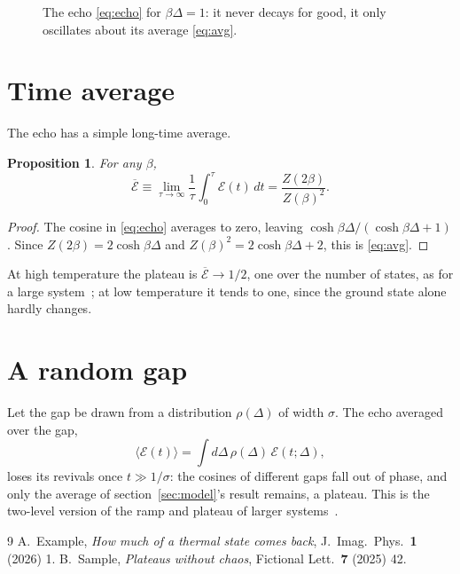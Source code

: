 \documentclass[11pt]{article}
\newtheorem{proposition}{Proposition}
\begin{document}
\begin{figure}[h]
\centering
{}
\caption{The echo \eqref{eq:echo} for $\beta\Delta = 1$: it never decays for good, it only oscillates about its
average \eqref{eq:avg}.}
\label{fig:echo}
\end{figure}

\section{Time average}

The echo has a simple long-time average.

\begin{proposition}
\label{prop:avg}
For any $\beta$,
\begin{equation}
  \overline{\mathcal{E}} \equiv \lim_{\tau\to\infty}\frac{1}{\tau}\int_0^\tau \mathcal{E}(t)\, dt
  = \frac{Z(2\beta)}{Z(\beta)^2}.
  \label{eq:avg}
\end{equation}
\end{proposition}

\begin{proof}
The cosine in \eqref{eq:echo} averages to zero, leaving $\cosh\beta\Delta/(\cosh\beta\Delta+1)$. Since
$Z(2\beta) = 2\cosh\beta\Delta$ and $Z(\beta)^2 = 2\cosh\beta\Delta + 2$, this is \eqref{eq:avg}.
\end{proof}

At high temperature the plateau is $\overline{\mathcal{E}} \to 1/2$, one over the number of states, as for a
large system~\cite{Toy2}; at low temperature it tends to one, since the ground state alone hardly changes.

\section{A random gap}

Let the gap be drawn from a distribution $\rho(\Delta)$ of width $\sigma$. The echo averaged over the gap,
\begin{equation}
  \langle \mathcal{E}(t) \rangle = \int d\Delta\, \rho(\Delta)\, \mathcal{E}(t;\Delta),
  \label{eq:random}
\end{equation}
loses its revivals once $t \gg 1/\sigma$: the cosines of different gaps fall out of phase, and only the average
of section~\ref{sec:model}'s result remains, a plateau. This is the two-level version of the ramp and plateau of
larger systems~\cite{Toy1,Toy2}.

\begin{thebibliography}{9}
 A.~Example, \emph{How much of a thermal state comes back}, J.~Imag.~Phys.~\textbf{1} (2026) 1.
 B.~Sample, \emph{Plateaus without chaos}, Fictional Lett.~\textbf{7} (2025) 42.
\end{thebibliography}
\end{document}
